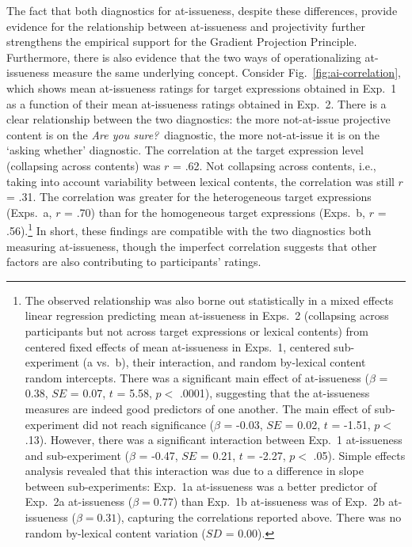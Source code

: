 \documentclass[11pt,fleqn]{article}
\newcommand{\6}{\mbox{$[\hspace*{-.6mm}[$}}
\newcommand{\9}{\mbox{$]\hspace*{-.6mm}]$}}
\newcommand{\figref}[1]{Fig.~\ref{#1}}
\begin{document}
The fact that both diagnostics for at-issueness, despite these differences, provide evidence for the relationship between at-issueness and projectivity  further strengthens the empirical support for the Gradient Projection Principle. Furthermore, there is also evidence that the two ways of operationalizing at-issueness measure the same underlying concept. Consider \figref{fig:ai-correlation}, which shows mean at-issueness ratings for target expressions obtained in Exp.~1 as a function of their mean at-issueness ratings obtained in Exp.~2. There is a clear relationship between the two diagnostics: the more not-at-issue projective content is on the {\em Are you sure?}~diagnostic, the more not-at-issue it is on the `asking whether' diagnostic. The correlation at the target expression level (collapsing across contents) was $r$ = .62. Not collapsing across contents, i.e., taking into account variability between lexical contents, the correlation was still $r$ = .31. The correlation was greater for the heterogeneous target expressions (Exps.~a, $r$ = .70) than for the homogeneous target expressions (Exps.~b, $r$ = .56).\footnote{The observed relationship was also borne out statistically in a mixed effects linear regression predicting mean at-issueness in Exps.~2 (collapsing across participants but not across target expressions or lexical contents) from centered fixed effects of mean at-issueness in Exps.~1, centered sub-experiment (a vs.~b), their interaction, and random by-lexical content random intercepts. There was a significant main effect of at-issueness ($\beta$ = 0.38, $SE$ = 0.07, $t$ = 5.58, $p <$ .0001), suggesting that the at-issueness measures are indeed good predictors of one another. The main effect of sub-experiment did not reach significance  ($\beta$ = -0.03, $SE$ = 0.02, $t$ = -1.51, $p <$ .13). However, there was a significant interaction between Exp.~1 at-issueness and sub-experiment ($\beta$ = -0.47, $SE$ = 0.21, $t$ = -2.27, $p <$ .05). Simple effects analysis revealed that this interaction was due to a difference in slope between sub-experiments: Exp.~1a at-issueness was a better predictor of Exp.~2a at-issueness ($\beta = 0.77$) than Exp.~1b at-issueness was of Exp.~2b at-issueness ($\beta = 0.31$), capturing the correlations reported above. There was no random by-lexical content variation  ($SD$ = 0.00).} In short, these findings are compatible with the two diagnostics both measuring at-issueness, though the imperfect correlation suggests that other factors are also contributing to participants' ratings.
\end{document}
